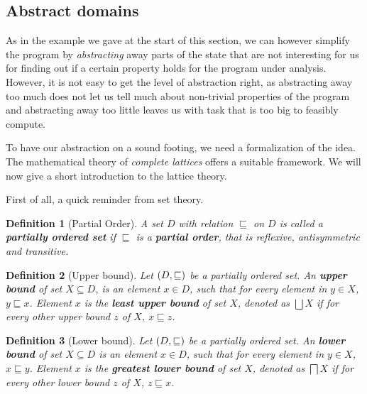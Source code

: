 \documentclass[..thesis.tex]{subfiles}
\newtheorem{defin}{Definition}[section]
\begin{document}
\subsection{Abstract domains}

As in the example we gave at the start of this section, we can however simplify the program by \textit{abstracting} away parts
of the state that are not interesting for us for finding out if a certain property holds for the program under analysis. 
However, it is not easy to get the level of abstraction right, as abstracting away too much does not let us tell much about non-trivial properties
of the program and abstracting away too little leaves us with task that is too big to feasibly compute.


To have our abstraction on a sound footing, we need a formalization of the idea.
The mathematical theory of \textit{complete lattices} offers a suitable framework.
We will now give a short introduction to the lattice theory.


First of all, a quick reminder from set theory.

\begin{defin}[Partial Order]
A set $D$ with relation $\sqsubseteq$ on $D$ is called a \textbf{partially ordered set} if $\sqsubseteq$ 
is a \textbf{partial order}, that is reflexive, antisymmetric and transitive.
\end{defin}

\begin{defin}[Upper bound]
Let $\left( D, \sqsubseteq \right)$ be a partially ordered set. An \textbf{upper bound} of set $X \subseteq D$,  is an element $x \in D$, such that for every element in $y \in X$, $y \sqsubseteq x$. Element $x$ is the \textbf{least upper bound} of set $X$, denoted as $\bigsqcup X$ if for every other upper bound $z$ of $X$, $x \sqsubseteq z$.  
\end{defin}

\begin{defin}[Lower bound]
Let $\left( D, \sqsubseteq \right)$ be a partially ordered set. An \textbf{lower bound} of set $X \subseteq D$  is an element $x \in D$, such that for every element in $y \in X$, $x \sqsubseteq y$. Element $x$ is the \textbf{greatest lower bound} of set $X$, denoted as $\bigsqcap X$ if for every other lower bound $z$ of $X$, $z \sqsubseteq x$.    
\end{defin}
\end{document}
